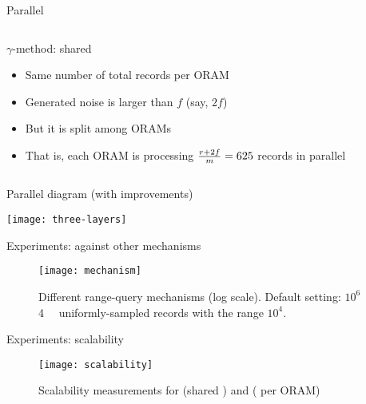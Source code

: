 \begin{frame}{Parallel \epsolute{}}
\begin{columns}[T]
\begin{column}{0.5\textwidth}
{\begin{block}{$\gamma$-method: shared \serverDS{}}
						\begin{itemize}[leftmargin=*]
							\item Same number of total records per ORAM
							\item Generated noise is larger than $f$ (say, $2f$)
							\item But it is split among \oramsNumber{} ORAMs
							\item That is, each ORAM is processing $\frac{r + 2f}{m} = \num{625}$ records in parallel
						\end{itemize}

					\end{block}
				}

			\end{column}

		\end{columns}

	\end{frame}

	\begin{frame}{Parallel \epsolute{} diagram (with improvements)}

		\centering
		\texttt{[image: three-layers]}

	\end{frame}

	\begin{frame}{Experiments: against other mechanisms}

		\begin{figure}[h]
			\centering
			\texttt{[image: mechanism]}
			\caption{
				\centering
				Different range-query mechanisms (log scale).
				Default setting: $10^6$ \SI{4}{\kibi\byte} uniformly-sampled records with the range $10^4$.
			}%
		\end{figure}

	\end{frame}

	\begin{frame}{Experiments: scalability}

		\begin{figure}[h]
			\centering
			\texttt{[image: scalability]}
			\caption{Scalability measurements for \protocolGamma{} (shared \serverDS{}) and \protocolNoGamma{} (\serverDS{} per ORAM)}%
		\end{figure}

	\end{frame}
